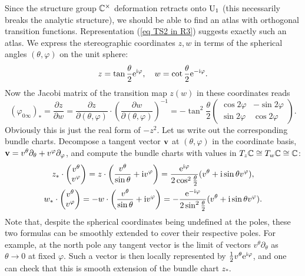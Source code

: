 \begin{example}
    Since the structure group $\bbC^\times$ deformation retracts onto $\U_1$ (this necessarily breaks the analytic structure), we should be able to find an atlas with orthogonal transition functions. Representation (\ref{eq TS2 in R3}) suggests exactly such an atlas. We express the stereographic coordinates $z,w$ in terms of the spherical angles $(\theta,\varphi)$ on the unit sphere:
    \[z=\tan\frac{\theta}{2}\rme^{\rmi\varphi},\quad w=\cot\frac{\theta}{2}\rme^{-\rmi\varphi}.\]
    Now the Jacobi matrix of the transition map $z(w)$ in these coordinates reads
    \[(\varphi_{0\infty})_\ast=\frac{\partial z}{\partial w}=\frac{\partial z}{\partial (\theta,\varphi)}\cdot\left(\frac{\partial w}{\partial (\theta,\varphi)}\right)^{-1}=-\tan^2\frac{\theta}{2}
    \begin{pmatrix}
        \cos2\varphi&-\sin2\varphi\\
        \sin2\varphi& \cos2\varphi
    \end{pmatrix}.
    \]
    Obviously this is just the real form of $-z^2$. Let us write out the corresponding bundle charts. Decompose a tangent vector $\bf{v}$ at $(\theta,\varphi)$ in the coordinate basis, $\bf{v}=v^\theta\partial_\theta+v^\varphi\partial_\varphi$, and compute the bundle charts with values in $T_z\bbC\cong T_w\bbC\cong\bbC$:
    \begin{gather}
        z_\ast\cdot\begin{pmatrix}
            v^\theta\\v^\varphi
        \end{pmatrix}=z \cdot \left(\frac{v^\theta}{\sin\theta}+\rmi v^\varphi\right)=\frac{\rme^{\rmi\varphi}}{2\cos^2\frac{\theta}{2}}(v^\theta+\rmi\sin\theta v^\varphi),\\
        w_\ast\cdot\begin{pmatrix}
            v^\theta\\v^\varphi
        \end{pmatrix}=-w\cdot \left(\frac{v^\theta}{\sin\theta}+\rmi v^\varphi\right)=-\frac{\rme^{-\rmi\varphi}}{2\sin^2\frac{\theta}{2}}(v^\theta+\rmi\sin\theta v^\varphi).
    \end{gather}
    Note that, despite the spherical coordinates being undefined at the poles, these two formulas can be smoothly extended to cover their respective poles. For example, at the north pole any tangent vector is the limit of vectors $v^\theta\partial_\theta$ as $\theta\to 0$ at fixed $\varphi$. Such a vector is then locally represented by $\frac12 v^\theta \rme^{\rmi\varphi}$, and one can check that this is smooth extension of the bundle chart $z_\ast$.


\end{example}

